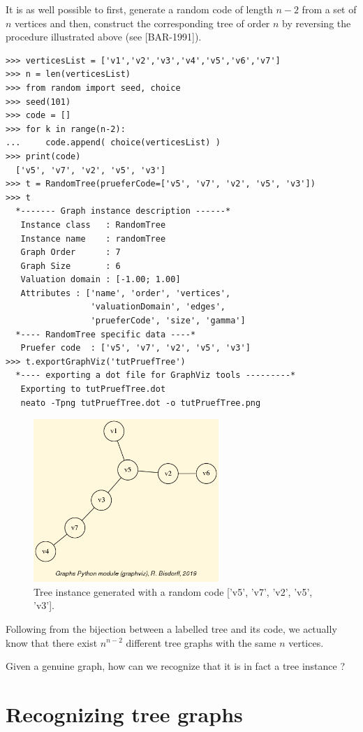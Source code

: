 It is as well possible to first, generate a random \Pruefer code of length $n-2$ from a set of $n$ vertices and then, construct the corresponding tree of order $n$ by reversing the procedure illustrated above (see [BAR-1991]).
\begin{lstlisting}
>>> verticesList = ['v1','v2','v3','v4','v5','v6','v7']
>>> n = len(verticesList)
>>> from random import seed, choice
>>> seed(101)
>>> code = []
>>> for k in range(n-2):
...     code.append( choice(verticesList) )
>>> print(code)
  ['v5', 'v7', 'v2', 'v5', 'v3']
>>> t = RandomTree(prueferCode=['v5', 'v7', 'v2', 'v5', 'v3'])
>>> t
  *------- Graph instance description ------*
   Instance class   : RandomTree
   Instance name    : randomTree
   Graph Order      : 7
   Graph Size       : 6
   Valuation domain : [-1.00; 1.00]
   Attributes : ['name', 'order', 'vertices',
                 'valuationDomain', 'edges',
                 'prueferCode', 'size', 'gamma']
  *---- RandomTree specific data ----*
   Pruefer code  : ['v5', 'v7', 'v2', 'v5', 'v3']
>>> t.exportGraphViz('tutPruefTree')
  *---- exporting a dot file for GraphViz tools ---------*
   Exporting to tutPruefTree.dot
   neato -Tpng tutPruefTree.dot -o tutPruefTree.png
\end{lstlisting}
\begin{figure}[h]
\sidecaption
\includegraphics[width=7cm]{Figures/tutPruefTree.png}
\caption{Tree instance generated with a random \Pruefer code ['v5', 'v7', 'v2', 'v5', 'v3'].} 
\label{fig:23.2}       %
\end{figure}

Following from the bijection between a labelled tree and its \Pruefer code, we actually know that there exist $n^{n-2}$ different tree graphs with the same $n$ vertices.

Given a genuine graph, how can we recognize that it is in fact a tree instance ?

\section{Recognizing tree graphs}
\label{sec:23.2}

